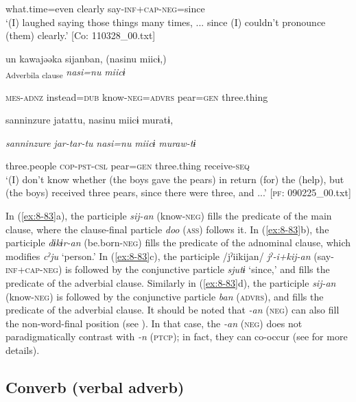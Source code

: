       what.time=even  clearly  say-\textsc{inf}+\textsc{cap}-\textsc{neg}=since\\
\glt ‘(I) laughed saying those things many times, ... since (I) couldn’t pronounce (them) clearly.’ [Co: 110328\_00.txt]

\ex
{\TM}
\glll  un  kawajəəka  sijanban,  (nasinu  miicɨ,)\\
[\textit{u-n}  \textit{kawajəə=ka}  \textit{sij-an=ban}]\textsubscript{Adverbila clause}  \textit{nasi=nu}  \textit{miicɨ}

      \textsc{mes}-\textsc{adnz}  instead=\textsc{dub}  know-\textsc{neg}=\textsc{advrs}  pear=\textsc{gen}  three.thing

      {\textbar}sanninzure{\textbar}  jatattu,  nasinu  miicɨ  muratɨ,

      \textit{sanninzure}  \textit{jar-tar-tu}  \textit{nasi=nu}  \textit{miicɨ}  \textit{muraw-tɨ}

      three.people  \textsc{cop}-\textsc{pst}-\textsc{csl}  pear=\textsc{gen}  three.thing  receive-\textsc{seq}\\
\glt ‘(I) don’t know whether (the boys gave the pears) in return (for) the (help), but (the boys) received three pears, since there were three, and ...’ [\textsc{pf}: 090225\_00.txt]
\z
\z

In (\ref{ex:8-83}a), the participle \textit{sij-an} (know-\textsc{neg}) fills the predicate of the main clause, where the clause-final particle \textit{doo} (\textsc{ass}) follows it. In (\ref{ex:8-83}b), the participle \textit{dɨkɨr-an} (be.born-\textsc{neg}) fills the predicate of the adnominal clause, which modifies \textit{cˀju} ‘person.’ In (\ref{ex:8-83}c), the participle /jˀiikijan/ \textit{jˀ-i+kij-an} (say-\textsc{inf}+\textsc{cap}-\textsc{neg}) is followed by the conjunctive particle \textit{sjutɨ} ‘since,’ and fills the predicate of the adverbial clause. Similarly in (\ref{ex:8-83}d), the participle \textit{sij-an} (know-\textsc{neg}) is followed by the conjunctive particle \textit{ban} (\textsc{advrs}), and fills the predicate of the adverbial clause. It should be noted that \textit{-an} (\textsc{neg}) can also fill the non-word-final position (see ). In that case, the \textit{-an} (\textsc{neg}) does not paradigmatically contrast with \textit{-n} (\textsc{ptcp}); in fact, they can co-occur (see  for more details).

\subsection{Converb (verbal adverb)}

